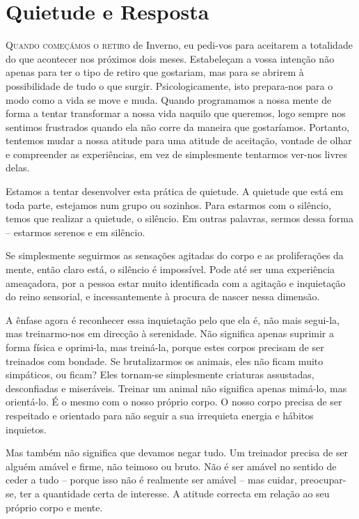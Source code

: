 \chapter{Quietude e Resposta}

\lettrine{Q}{uando começámos o retiro} de Inverno, eu pedi-vos para aceitarem a totalidade
do que acontecer nos próximos dois meses. Estabeleçam a vossa intenção não
apenas para ter o tipo de retiro que gostariam, mas para se abrirem à
possibilidade de tudo o que surgir. Psicologicamente, isto prepara-nos para o
modo como a vida se move e muda. Quando programamos a nossa mente de forma a
tentar transformar a nossa vida naquilo que queremos, logo sempre nos sentimos
frustrados quando ela não corre da maneira que gostaríamos. Portanto, tentemos
mudar a nossa atitude para uma atitude de aceitação, vontade de olhar e
compreender as experiências, em vez de simplesmente tentarmos ver-nos livres
delas.

Estamos a tentar desenvolver esta prática de quietude. A quietude que está em
toda parte, estejamos num grupo ou sozinhos. Para estarmos com o silêncio, temos
que realizar a quietude, o silêncio. Em outras palavras, sermos dessa forma --
estarmos serenos e em silêncio.

Se simplesmente seguirmos as sensações agitadas do corpo e as proliferações da
mente, então claro está, o silêncio é impossível. Pode até ser uma experiência
ameaçadora, por a pessoa estar muito identificada com a agitação e inquietação
do reino sensorial, e incessantemente à procura de nascer nessa dimensão.

A ênfase agora é reconhecer essa inquietação pelo que ela é, não mais segui-la,
mas treinarmo-nos em direcção à serenidade. Não significa apenas suprimir a
forma física e oprimi-la, mas treiná-la, porque estes corpos precisam de ser
treinados com bondade. Se brutalizarmos os animais, eles não ficam muito
simpáticos, ou ficam? Eles tornam-se simplesmente criaturas assustadas,
desconfiadas e miseráveis. Treinar um animal não significa apenas mimá-lo, mas
orientá-lo. É o mesmo com o nosso próprio corpo. O nosso corpo precisa de ser
respeitado e orientado para não seguir a sua irrequieta energia e hábitos
inquietos.

Mas também não significa que devamos negar tudo. Um treinador precisa de ser
alguém amável e firme, não teimoso ou bruto. Não é ser amável no sentido de
ceder a tudo -- porque isso não é realmente ser amável -- mas cuidar,
preocupar-se, ter a quantidade certa de interesse. A atitude correcta em relação
ao seu próprio corpo e mente.

